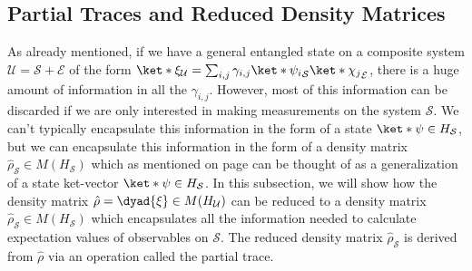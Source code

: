 \documentclass[12pt]{report}
\begin{document}
    \subsection{Partial Traces and Reduced Density Matrices}
    As already mentioned, if we have a general entangled state on a composite system $\mathcal{U}=\mathcal{S}+\mathcal{E}$ of the form  $\ket*{\xi}_\mathcal{U}=\sum_{i,j}\gamma_{i,j}\ket*{\psi_i}_\mathcal{S}\ket*{\chi_j}_\mathcal{E}$, there is a huge amount of information in all the $\gamma_{i,j}$. However, most of this information can be discarded if we are only interested in making measurements on the system $\mathcal{S}$. We can't typically encapsulate this information in the form of a state $\ket*{\psi}\in H_\mathcal{S}$, but we can encapsulate this information in the form of a density matrix $\hat{\rho}_\mathcal{S}\in M(H_\mathcal{S})$ which as mentioned on page \pageref{genket} can be thought of as a generalization of a state ket-vector $\ket*{\psi}\in H_\mathcal{S}$. In this subsection, we will show how the density matrix $\hat{\rho}=\dyad{\xi}\in M(H_\mathcal{U})$ can be reduced to a density matrix $\hat{\rho}_\mathcal{S}\in M(H_\mathcal{S})$ which encapsulates all the information needed to calculate expectation values of observables on $\mathcal{S}$. The reduced density matrix $\hat{\rho}_\mathcal{S}$ is derived from $\hat{\rho}$ via an operation called the partial trace.
\end{document}
